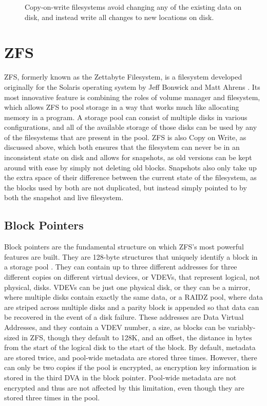 \begin{figure}[H]
    \centering
    \resizebox{0.75\linewidth}{!}{}
    \captionsetup{width=0.75\linewidth}
    \caption{Copy-on-write filesystems avoid changing any of the existing data on disk, and instead write all changes to new locations on disk\cite{ahrens_openzfs_basics}.}
    \label{fig:cow}
\end{figure}

\chapter{ZFS}
ZFS, formerly known as the Zettabyte Filesystem, is a filesystem developed originally for the Solaris operating system
by Jeff Bonwick and Matt Ahrens \cite{ahrens_read_write}. 
Its most innovative feature is combining the roles of volume manager and filesystem, which allows ZFS to pool storage in a way that 
works much like allocating memory in a program\cite{mckusick_zfs_2015_presentation}.
A storage pool can consist of multiple disks in various configurations, and all of the available storage of those disks
can be used by any of the filesystems that are present in the pool.
ZFS is also Copy on Write, as discussed above, which both ensures that the filesystem can never be in an inconsistent state on disk
and allows for snapshots, as old versions can be kept around with ease by simply not deleting old blocks.
Snapshots also only take up the extra space of their difference between the current state of the filesystem,
as the blocks used by both are not duplicated, but instead simply pointed to by both the snapshot and live filesystem.

\section{Block Pointers}
Block pointers are the fundamental structure on which ZFS's most powerful features are built. 
They are 128-byte structures that uniquely identify a block in a storage pool
\cite{ahrens_openzfs_basics,ahrens_read_write,mckusick_zfs_2015_presentation}. 
They can contain up to three different addresses for three different copies on different virtual devices, or VDEVs,
that represent logical, not physical, disks.
VDEVs can be just one physical disk, 
or they can be a mirror, where multiple disks contain exactly the same data,
or a RAIDZ pool,  where data are striped across multiple disks and a parity block is appended 
so that data can be recovered in the event of a disk failure.
These addresses are Data Virtual Addresses, and they contain a VDEV number, a size, as blocks can be variably-sized in ZFS, 
though they default to 128K, and an offset, the distance in bytes from the start of the logical disk
to the start of the block.
By default, metadata are stored twice, and pool-wide metadata are stored three times.
However, there can only be two copies if the pool is encrypted, as encryption key information is stored in the third DVA in the block pointer. 
Pool-wide metadata are not encrypted and thus are not affected by this limitation, even though they
are stored three times in the pool.

